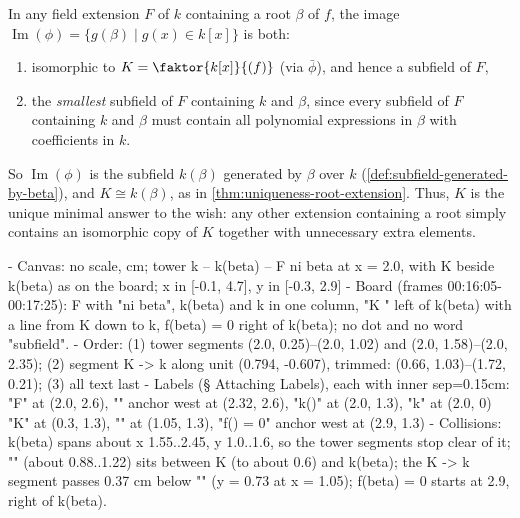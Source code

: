 \begin{content}
In any field extension $F$ of $k$ containing a root $\beta$ of $f$, the image $\operatorname{Im}(\phi) = \{ g(\beta) \mid g(x) \in k[x] \}$ is both:
\begin{enumerate}[label=\textbf{(\arabic*)}]
    \item isomorphic to $K = \faktor{k[x]}{(f)}$ (via $\bar{\phi}$), and hence a subfield of $F$,
    \item the \emph{smallest} subfield of $F$ containing $k$ and $\beta$, since every subfield of $F$ containing $k$ and $\beta$ must contain all polynomial expressions in $\beta$ with coefficients in $k$.
\end{enumerate}
So $\operatorname{Im}(\phi)$ is the subfield $k(\beta)$ generated by $\beta$ over $k$ (\cref{def:subfield-generated-by-beta}), and $K \cong k(\beta)$, as in \cref{thm:uniqueness-root-extension}. Thus, $K$ is the unique minimal answer to the wish: any other extension containing a root simply contains an isomorphic copy of $K$ together with unnecessary extra elements.

\begin{hidden}
- Canvas: no scale, cm; tower k -- k(beta) -- F ni beta at x = 2.0, with K beside k(beta) as on the board; x in [-0.1, 4.7], y in [-0.3, 2.9]
- Board (frames 00:16:05-00:17:25): F with "ni beta", k(beta) and k in one column, "K \cong" left of k(beta) with a line from K down to k, f(beta) = 0 right of k(beta); no dot and no word "subfield".
- Order: (1) tower segments (2.0, 0.25)--(2.0, 1.02) and (2.0, 1.58)--(2.0, 2.35); (2) segment K -> k along unit (0.794, -0.607), trimmed: (0.66, 1.03)--(1.72, 0.21); (3) all text last
- Labels (§ Attaching Labels), each with inner sep=0.15cm:
  "F" at (2.0, 2.6), "\ni \beta" anchor west at (2.32, 2.6), "k(\beta)" at (2.0, 1.3), "k" at (2.0, 0)
  "K" at (0.3, 1.3), "\cong" at (1.05, 1.3), "f(\beta) = 0" anchor west at (2.9, 1.3)
- Collisions: k(beta) spans about x 1.55..2.45, y 1.0..1.6, so the tower segments stop clear of it; "\cong" (about 0.88..1.22) sits between K (to about 0.6) and k(beta); the K -> k segment passes 0.37 cm below "\cong" (y = 0.73 at x = 1.05); f(beta) = 0 starts at 2.9, right of k(beta).
\end{hidden}
\begin{center}
\end{center}
\end{content}

